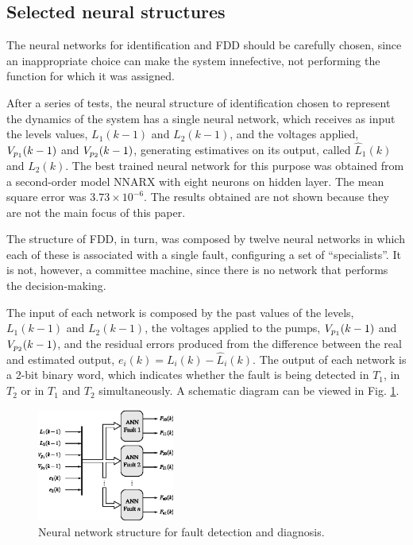 \documentclass[10pt,fleqn,a4paper]{article}
\begin{document}
\subsection{Selected neural structures}
The neural networks for identification and FDD should be carefully chosen, since
an inappropriate choice can make the system innefective, not performing the
function for which it was assigned.

After a series of tests, the neural structure of identification chosen to
represent the dynamics of the system has a single neural network, which receives
as input the levels values, $L_1(k-1)$ and $L_2 (k-1)$, and the voltages
applied, $V_{p_{\tiny 1}} (k-1)$ and $V_{p_{\tiny 2}} (k-1)$, generating
estimatives on its output, called $\widehat{L}_1 (k)$ and $\widehat{L}_2 (k)$.
The best trained neural network for this purpose was obtained from a
second-order model NNARX with eight neurons on hidden layer. The mean square
error was $3.73 \times 10^{-6}$. The results obtained are not shown because they
are not the main focus of this paper.

The structure of FDD, in turn, was composed by twelve neural networks in which
each of these is associated with a single fault, configuring a set of
``specialists''. It is not, however, a committee machine, since there is no
network that performs the decision-making.

The input of each network is composed by the past values of the levels,
$L_1(k-1)$ and $L_2(k-1)$, the voltages applied to the pumps, $V_{p_{\tiny 1}}
(k-1)$ and $V_{p_{\tiny 2}} (k-1)$, and the residual errors produced from the
difference between the real and estimated output, $e_i (k) = L_i (k) -
\widehat{L}_i (k)$. The output of each network is a 2-bit binary word, which
indicates whether the fault is being detected in $T_1$, in $T_2$ or in $T_1$ and
$T_2$ simultaneously. A schematic diagram can be viewed in Fig.
\ref{fig:ann_fdd}.

\begin{figure}[htb]
\centering
    \includegraphics[width=0.4\textwidth]{imgs/ann_fdd}
    \caption{Neural network structure for fault detection and diagnosis.}
    \label{fig:ann_fdd}
\end{figure}
\end{document}
